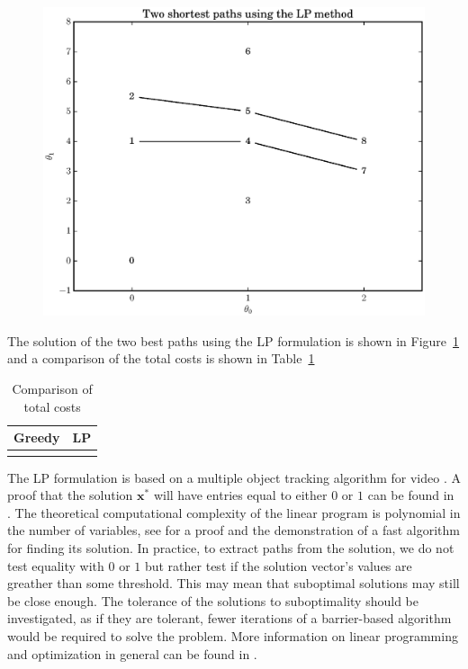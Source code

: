 \begin{figure}[!t]
    \caption{\label{plot:simple_graph_lp_paths}}
    \centering
    \includegraphics[width=\figwidthscale\textwidth]{plots/small_graph_ex_lp_paths.eps}
\end{figure}

The solution of the two best paths using the LP formulation
is shown in Figure~\ref{plot:simple_graph_lp_paths} and a comparison of the
total costs is shown in Table~\ref{tab:greedy_lp_cost_compare}

\begin{table}
    \caption{\label{tab:greedy_lp_cost_compare} Comparison of total costs}
    \begin{center}
        \begin{tabular}{c c}
            Greedy & LP \\
            \hline
             &
             \\
        \end{tabular}
    \end{center}
\end{table}

The LP formulation is based on a multiple object tracking algorithm for video
\cite{jiang2007linear}. A proof that the solution $\boldsymbol{x}^{\ast}$ will
have entries equal to either $0$ or $1$ can be found in
\cite[p.~167]{parker1988discrete}. The theoretical computational complexity of
the linear program is polynomial in the number of variables, see
\cite{karmarkar1984new} for a proof and the demonstration of a fast algorithm
for finding its solution. In practice, to extract paths from the solution, we do
not test equality with $0$ or $1$ but rather test if the solution vector's
values are greather than some threshold. This may mean that suboptimal solutions
may still be close enough. The tolerance of the solutions to suboptimality
should be investigated, as if they are tolerant, fewer iterations of a
barrier-based algorithm would be required to solve the problem. More information
on linear programming and optimization in general can be found in
\cite{boyd2004convex}.

